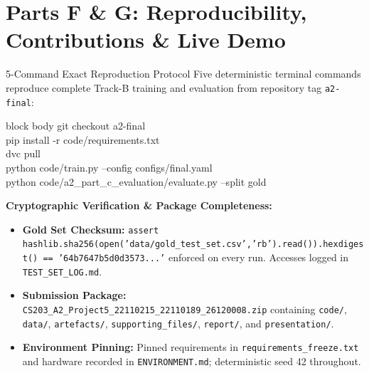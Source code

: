 \documentclass[10pt]{beamer}
\begin{document}
\section{Parts F \& G: Reproducibility, Contributions \& Live Demo}

\begin{frame}[fragile]{5-Command Exact Reproduction Protocol}
    \footnotesize
    Five deterministic terminal commands reproduce complete Track-B training and evaluation from repository tag \texttt{a2-final}:\\[4pt]

\begin{beamercolorbox}[sep=4pt,shadow=false,rounded=true]{block body}
\ttfamily\footnotesize
git checkout a2-final\\
pip install -r code/requirements.txt\\
dvc pull\\
python code/train.py --config configs/final.yaml\\
python code/a2\_part\_c\_evaluation/evaluate.py --split gold
\end{beamercolorbox}

    \vspace{3pt}
    \textbf{Cryptographic Verification \& Package Completeness:}
    \begin{itemize}\setlength{\itemsep}{1pt}
        \item \textbf{Gold Set Checksum:} \texttt{assert hashlib.sha256(open('data/gold\_test\_set.csv','rb').read()).hexdigest() == '64b7647b5d0d3573...'} enforced on every run. Accesses logged in \texttt{TEST\_SET\_LOG.md}.
        \item \textbf{Submission Package:} \texttt{CS203\_A2\_Project5\_22110215\_22110189\_26120008.zip} containing \texttt{code/}, \texttt{data/}, \texttt{artefacts/}, \texttt{supporting\_files/}, \texttt{report/}, and \texttt{presentation/}.
        \item \textbf{Environment Pinning:} Pinned requirements in \texttt{requirements\_freeze.txt} and hardware recorded in \texttt{ENVIRONMENT.md}; deterministic seed 42 throughout.
    \end{itemize}
\end{frame}
\end{document}
